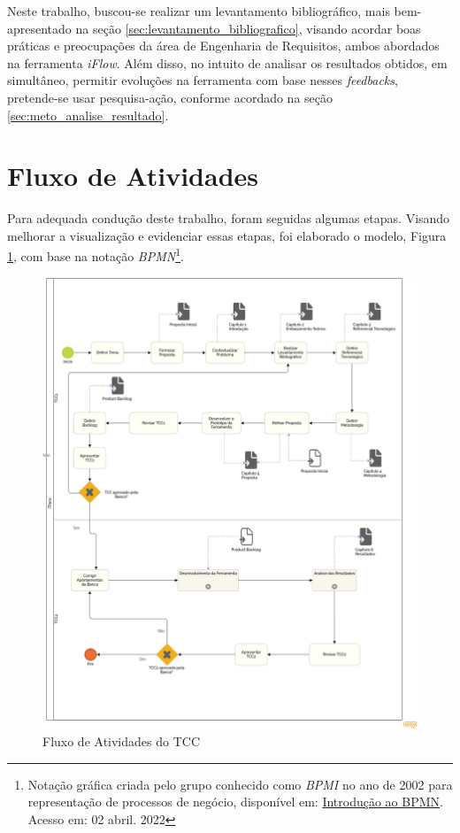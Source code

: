 Neste trabalho, buscou-se realizar um levantamento bibliográfico, mais bem-apresentado na seção \ref{sec:levantamento_bibliografico}, visando acordar boas práticas e preocupações da área de Engenharia de Requisitos, ambos abordados na ferramenta \textit{iFlow}. Além disso, no intuito de analisar os resultados obtidos, em simultâneo, permitir evoluções na ferramenta com base nesses \textit{feedbacks}, pretende-se usar pesquisa-ação, conforme acordado na seção \ref{sec:meto_analise_resultado}.

\section{Fluxo de Atividades}

\label{sec:fluxo_atividade}
    
Para adequada condução deste trabalho, foram seguidas algumas etapas. Visando melhorar a visualização e evidenciar essas etapas, foi elaborado o modelo, Figura \ref{fig:bpmn_geral}, com base na notação \textit{BPMN}\footnote{Notação gráfica criada pelo grupo conhecido como \textit{BPMI} no ano de 2002 para representação de processos de negócio, disponível em: \href{https://www.devmedia.com.br/introducao-ao-business-process-modeling-notation-bpmn/29892}{Introdução ao BPMN}. Acesso em: 02 abril. 2022}.

\begin{figure}[H]
    \begin{center}
        \caption{Fluxo de Atividades do TCC}
        \label{fig:bpmn_geral}
        \includegraphics[scale=0.3]{figuras/Metodologia/bpmn_geral.png}
    \end{center}
\end{figure}

